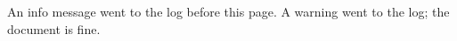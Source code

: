 \documentclass{article}
\begin{document}
An info message went to the log before this page.
A warning went to the log; the document is fine.
\end{document}
